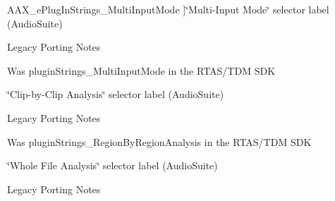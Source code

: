 \begin{Desc}
\begin{description}
{\hypertarget{a00206_a86f7310877399d9d4d2ea4863d472476a4e05ed47ae75ef3c99ed7b5599da6e53}{}A\+A\+X\+\_\+e\+Plug\+In\+Strings\+\_\+\+Multi\+Input\+Mode\label{a00206_a86f7310877399d9d4d2ea4863d472476a4e05ed47ae75ef3c99ed7b5599da6e53}
}]\char`\"{}\+Multi-\/\+Input Mode\char`\"{} selector label (Audio\+Suite) \begin{DoxyRefDesc}{Legacy Porting Notes}
\item[\hyperlink{a00384__porting_notes000014}{Legacy Porting Notes}]Was plugin\+Strings\+\_\+\+Multi\+Input\+Mode in the R\+T\+A\+S/\+T\+D\+M S\+D\+K \end{DoxyRefDesc}
\item[{\em 
\hypertarget{a00206_a86f7310877399d9d4d2ea4863d472476ae3a832bfc597a707358610647b3f51c3}{}A\+A\+X\+\_\+e\+Plug\+In\+Strings\+\_\+\+Region\+By\+Region\+Analysis\label{a00206_a86f7310877399d9d4d2ea4863d472476ae3a832bfc597a707358610647b3f51c3}
}]\char`\"{}\+Clip-\/by-\/\+Clip Analysis\char`\"{} selector label (Audio\+Suite) \begin{DoxyRefDesc}{Legacy Porting Notes}
\item[\hyperlink{a00384__porting_notes000015}{Legacy Porting Notes}]Was plugin\+Strings\+\_\+\+Region\+By\+Region\+Analysis in the R\+T\+A\+S/\+T\+D\+M S\+D\+K \end{DoxyRefDesc}
\item[{\em 
\hypertarget{a00206_a86f7310877399d9d4d2ea4863d472476a18ce96adcc5420f19c7247bde5718490}{}A\+A\+X\+\_\+e\+Plug\+In\+Strings\+\_\+\+All\+Selected\+Regions\+Analysis\label{a00206_a86f7310877399d9d4d2ea4863d472476a18ce96adcc5420f19c7247bde5718490}
}]\char`\"{}\+Whole File Analysis\char`\"{} selector label (Audio\+Suite) \begin{DoxyRefDesc}{Legacy Porting Notes}

\end{DoxyRefDesc}
\end{description}
\end{Desc}
